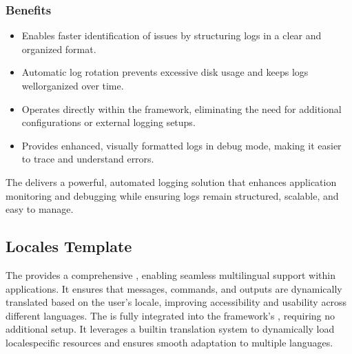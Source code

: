 \documentclass[letterpaper,10pt,english]{sphinxhowto}
\begin{document}
\subsubsection{Benefits}
\label{\detokenize{templates/logs/index:benefits}}\begin{itemize}
\item {} 
\sphinxAtStartPar
{}
Enables faster identification of issues by structuring logs in a clear and organized format.

\item {} 
\sphinxAtStartPar
{}
Automatic log rotation prevents excessive disk usage and keeps logs well\sphinxhyphen{}organized over time.

\item {} 
\sphinxAtStartPar
{}
Operates directly within the framework, eliminating the need for additional configurations or external logging setups.

\item {} 
\sphinxAtStartPar
{}
Provides enhanced, visually formatted logs in debug mode, making it easier to trace and understand errors.

\end{itemize}

\sphinxAtStartPar
The  delivers a powerful, automated logging solution that enhances application monitoring and debugging while ensuring logs remain structured, scalable, and easy to manage.

\sphinxstepscope


\subsection{Locales Template}
\label{\detokenize{templates/locales/index:locales-template}}\label{\detokenize{templates/locales/index::doc}}
\sphinxAtStartPar
The  provides a comprehensive , enabling seamless multilingual support within applications. It ensures that messages, commands, and outputs are dynamically translated based on the user’s locale, improving accessibility and usability across different languages.
The  is fully integrated into the framework’s , requiring no additional setup. It leverages a built\sphinxhyphen{}in translation system to dynamically load locale\sphinxhyphen{}specific resources and ensures smooth adaptation to multiple languages.
\end{document}
